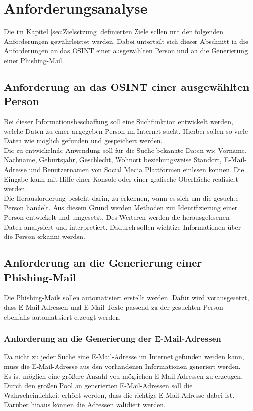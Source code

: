 
\chapter{Anforderungsanalyse}  %
\label{cha:Anforderungsanalyse} %
Die im Kapitel \ref{sec:Zielsetzung} definierten Ziele sollen mit den folgenden Anforderungen gewährleistet werden. Dabei unterteilt sich dieser Abschnitt in die Anforderungen an das OSINT einer ausgewählten Person und an die Generierung einer Phishing-Mail.

\section{Anforderung an das OSINT einer ausgewählten Person}
Bei dieser Informationsbeschaffung soll eine Suchfunktion entwickelt werden, welche Daten zu einer angegeben Person im Internet sucht. Hierbei sollen so viele Daten wie möglich gefunden und gespeichert werden.\\
Die zu entwickelnde Anwendung soll für die Suche bekannte Daten wie Vorname, Nachname, Geburtsjahr, Geschlecht, Wohnort beziehungsweise Standort, E-Mail-Adresse und Benutzernamen von Social Media Plattformen einlesen können. Die Eingabe kann mit Hilfe einer Konsole oder einer grafische Oberfläche realisiert werden.\\
Die Herausforderung besteht darin, zu erkennen, wann es sich um die gesuchte Person handelt. Aus diesem Grund werden Methoden zur Identifizierung einer Person entwickelt und umgesetzt. Des Weiteren werden die herausgelesenen Daten analysiert und interpretiert. Dadurch sollen wichtige Informationen über die Person erkannt werden.

\section{Anforderung an die Generierung einer Phishing-Mail}
Die Phishing-Mails sollen automatisiert erstellt werden. Dafür wird vorausgesetzt, dass E-Mail-Adressen und E-Mail-Texte passend zu der gesuchten Person ebenfalls automatisiert erzeugt werden.
	\subsection{Anforderung an die Generierung der E-Mail-Adressen}
	Da nicht zu jeder Suche eine E-Mail-Adresse im Internet gefunden werden kann, muss die E-Mail-Adresse aus den vorhandenen Informationen generiert werden. Es ist möglich eine größere Anzahl von möglichen E-Mail-Adressen zu erzeugen. Durch den großen Pool an generierten E-Mail-Adressen soll die Wahrscheinlichkeit erhöht werden, dass die richtige E-Mail-Adresse dabei ist. Darüber hinaus können die Adressen validiert werden.
